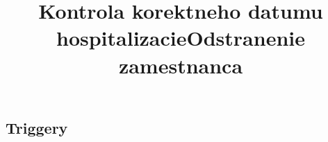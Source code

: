 \subsection{Triggery}

\title{Kontrola korektneho datumu hospitalizacie}

\title{Odstranenie zamestnanca}
